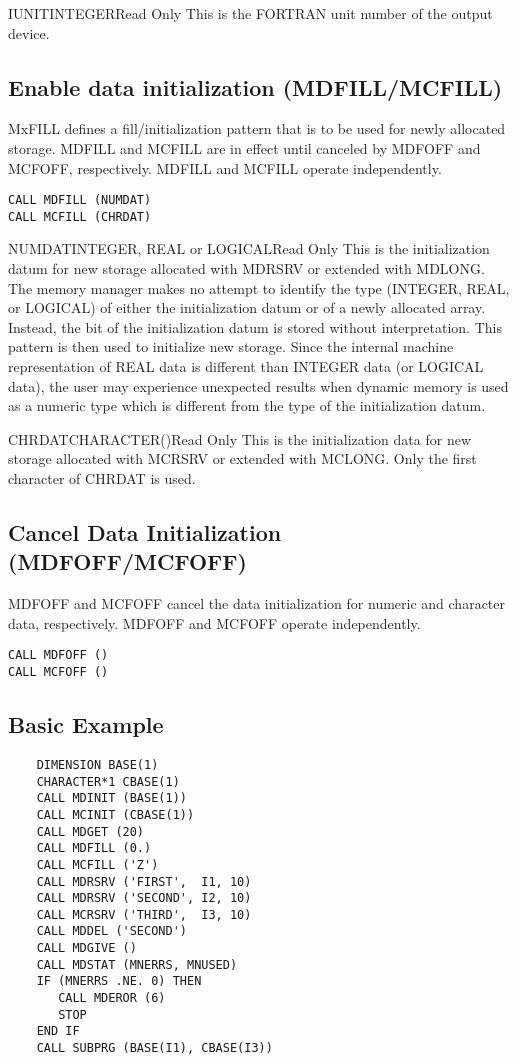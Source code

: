 \begin{argy}{IUNIT}{INTEGER}{Read Only}
This is the FORTRAN unit number of the output device.
\end{argy}


\subsection{Enable data initialization (MDFILL/MCFILL)}
MxFILL defines a fill/initialization pattern that is to be used
for newly allocated storage. MDFILL and MCFILL are in effect until canceled
by MDFOFF and MCFOFF, respectively.  MDFILL and MCFILL operate
independently.
\begin{verbatim}
CALL MDFILL (NUMDAT)
CALL MCFILL (CHRDAT)
\end{verbatim}

\begin{argy}{NUMDAT}{INTEGER, REAL or LOGICAL}{Read Only}
This is the initialization datum for new storage al\-lo\-cat\-ed with MDRSRV
or extended with MDLONG. The memory manager makes no attempt to identify the
type (INTEGER, REAL, or LOGICAL) of either the initialization datum or of a
newly allocated array. Instead, the bit of the initialization datum is
stored without interpretation. This pattern is then used to initialize new
storage. Since the internal machine representation of REAL data is different
than INTEGER data (or LOGICAL data), the user may experience unexpected
results when dynamic memory is used as a numeric type which is different
from the type of the initialization datum.
\end{argy}

\begin{argy}{CHRDAT}{CHARACTER\last(\last)}{Read Only}
This is the initialization data for new storage al\-lo\-cat\-ed with MCRSRV or
extended with MCLONG. Only the first character of CHRDAT is used.
\end{argy}

\subsection{Cancel Data Initialization (MDFOFF/MCFOFF)}
MDFOFF and MCFOFF cancel the data initialization for numeric and character
data, respectively.  MDFOFF and MCFOFF operate independently.
\begin{verbatim}
CALL MDFOFF ()
CALL MCFOFF ()
\end{verbatim}

\subsection{Basic Example}
\begin{verbatim}
    DIMENSION BASE(1)
    CHARACTER*1 CBASE(1)
    CALL MDINIT (BASE(1))
    CALL MCINIT (CBASE(1))
    CALL MDGET (20)
    CALL MDFILL (0.)
    CALL MCFILL ('Z')
    CALL MDRSRV ('FIRST',  I1, 10)
    CALL MDRSRV ('SECOND', I2, 10)
    CALL MCRSRV ('THIRD',  I3, 10)
    CALL MDDEL ('SECOND')
    CALL MDGIVE ()
    CALL MDSTAT (MNERRS, MNUSED)
    IF (MNERRS .NE. 0) THEN
       CALL MDEROR (6)
       STOP
    END IF
    CALL SUBPRG (BASE(I1), CBASE(I3))
\end{verbatim}

